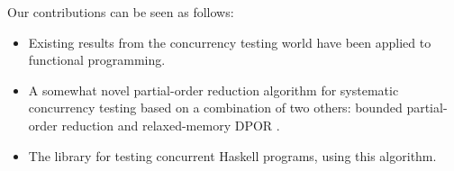Our contributions can be seen as follows:

\begin{itemize}
\item Existing results from the concurrency testing world have been
  applied to functional programming.

\item A somewhat novel partial-order reduction algorithm for
  systematic concurrency testing based on a combination of two others:
  bounded partial-order reduction \cite{bpor} and relaxed-memory DPOR
  \cite{rdpor}.

\item The \dejafu{} library for testing concurrent Haskell programs,
  using this algorithm.
\end{itemize}
